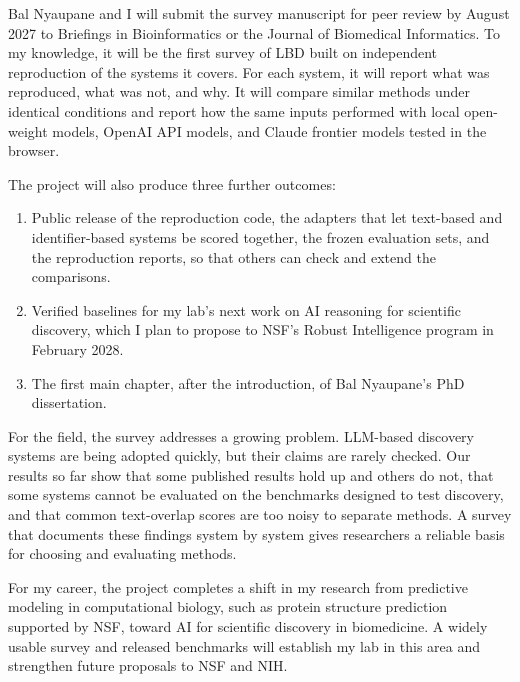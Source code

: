 \documentclass[11pt]{article}
\begin{document}
Bal Nyaupane and I will submit the survey manuscript for peer review by August 2027 to Briefings in Bioinformatics or the Journal of Biomedical Informatics. To my knowledge, it will be the first survey of LBD built on independent reproduction of the systems it covers. For each system, it will report what was reproduced, what was not, and why. It will compare similar methods under identical conditions and report how the same inputs performed with local open-weight models, OpenAI API models, and Claude frontier models tested in the browser.

The project will also produce three further outcomes:
\begin{enumerate}[label=(\arabic*)]
\item Public release of the reproduction code, the adapters that let text-based and identifier-based systems be scored together, the frozen evaluation sets, and the reproduction reports, so that others can check and extend the comparisons.
\item Verified baselines for my lab's next work on AI reasoning for scientific discovery, which I plan to propose to NSF's Robust Intelligence program in February 2028.
\item The first main chapter, after the introduction, of Bal Nyaupane's PhD dissertation.
\end{enumerate}

For the field, the survey addresses a growing problem. LLM-based discovery systems are being adopted quickly, but their claims are rarely checked. Our results so far show that some published results hold up and others do not, that some systems cannot be evaluated on the benchmarks designed to test discovery, and that common text-overlap scores are too noisy to separate methods. A survey that documents these findings system by system gives researchers a reliable basis for choosing and evaluating methods.

For my career, the project completes a shift in my research from predictive modeling in computational biology, such as protein structure prediction supported by NSF, toward AI for scientific discovery in biomedicine. A widely usable survey and released benchmarks will establish my lab in this area and strengthen future proposals to NSF and NIH.
\end{document}
